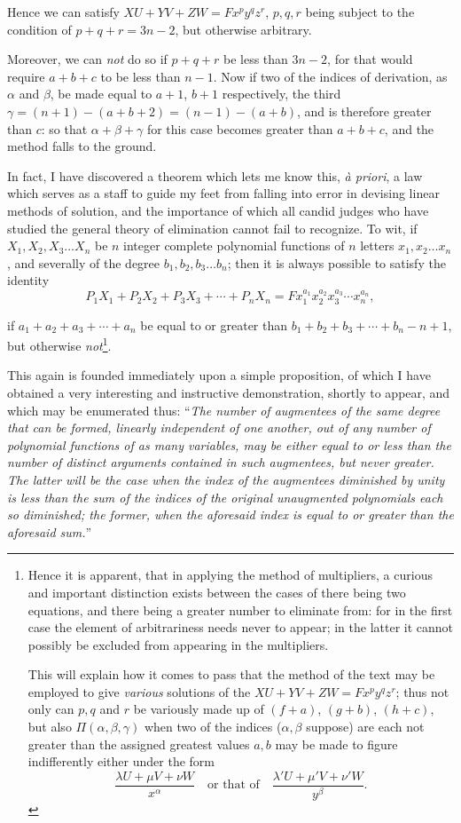 \documentclass[11pt]{article}
\newcommand{\sourcepage}[1]{\marginpar{\scriptsize p.~#1}}
\begin{document}
Hence we can satisfy $XU+YV+ZW=Fx^p y^q z^r$, $p,q,r$ being subject to the condition of $p+q+r=3n-2$, but otherwise arbitrary.

Moreover, we can \emph{not} do so if $p+q+r$ be less than $3n-2$, for that would require $a+b+c$ to be less than $n-1$. Now if two of the indices of derivation, as $\alpha$ and $\beta$, be made equal to $a+1$, $b+1$ respectively, the third $\gamma=(n+1)-(a+b+2)=(n-1)-(a+b)$, and is therefore greater than $c$: so that $\alpha+\beta+\gamma$ for this case becomes greater than $a+b+c$, and the method falls to the ground.

In fact, I have discovered a theorem which lets me know this, \emph{\`a priori}, a law which serves as a staff to guide my feet from falling into error in devising linear methods of solution, and the importance of which all candid judges who have studied the general theory of elimination cannot fail to recognize. To wit, if $X_1,X_2,X_3\ldots X_n$ be $n$ integer complete polynomial functions of $n$ letters $x_1,x_2\ldots x_n$, and severally of the degree $b_1,b_2,b_3\ldots b_n$; then it is always possible to satisfy the identity
\[
 P_1X_1+P_2X_2+P_3X_3+\cdots+P_nX_n=F x_1^{a_1}x_2^{a_2}x_3^{a_3}\cdots x_n^{a_n},
\]

\sourcepage{83}
if $a_1+a_2+a_3+\cdots+a_n$ be equal to or greater than $b_1+b_2+b_3+\cdots+b_n-n+1$, but otherwise \emph{not}\footnote{Hence it is apparent, that in applying the method of multipliers, a curious and important distinction exists between the cases of there being two equations, and there being a greater number to eliminate from: for in the first case the element of arbitrariness needs never to appear; in the latter it cannot possibly be excluded from appearing in the multipliers.

This will explain how it comes to pass that the method of the text may be employed to give \emph{various} solutions of the $XU+YV+ZW=Fx^p y^q z^r$; thus not only can $p,q$ and $r$ be variously made up of $(f+a)$, $(g+b)$, $(h+c)$, but also $\Pi(\alpha,\beta,\gamma)$ when two of the indices ($\alpha,\beta$ suppose) are each not greater than the assigned greatest values $a,b$ may be made to figure indifferently either under the form
\[
\frac{\lambda U+\mu V+\nu W}{x^\alpha}\quad\text{or that of}\quad
\frac{\lambda' U+\mu' V+\nu' W}{y^\beta}.
\]}.

This again is founded immediately upon a simple proposition, of which I have obtained a very interesting and instructive demonstration, shortly to appear, and which may be enumerated thus: ``\emph{The number of augmentees of the same degree that can be formed, linearly independent of one another, out of any number of polynomial functions of as many variables, may be either equal to or less than the number of distinct arguments contained in such augmentees, but never greater. The latter will be the case when the index of the augmentees diminished by unity is less than the sum of the indices of the original unaugmented polynomials each so diminished; the former, when the aforesaid index is equal to or greater than the aforesaid sum.}''
\end{document}
